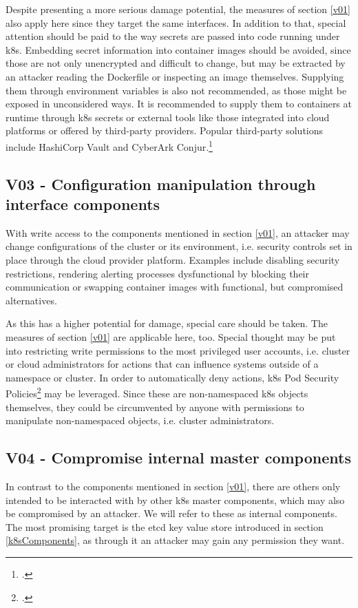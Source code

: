 Despite presenting a more serious damage potential, the measures of section \ref{v01} also apply here since they target the same interfaces.
In addition to that, special attention should be paid to the way secrets are passed into code running under \gls{k8s}. Embedding secret information into container images should be avoided, since those are not only unencrypted and difficult to change, but may be extracted by an attacker reading the Dockerfile or inspecting an image themselves. Supplying them through environment variables is also not recommended, as those might be exposed in unconsidered ways. It is recommended to supply them to containers at runtime through \gls{k8s} secrets or external tools like those integrated into cloud platforms or offered by third-party providers. Popular third-party solutions include HashiCorp Vault and CyberArk Conjur.\footcite[][, chapter 7]{k8sBook}

\subsection{V03 - Configuration manipulation through interface components}
With write access to the components mentioned in section \ref{v01}, an attacker may change configurations of the cluster or its environment, i.e. security controls set in place through the cloud provider platform. Examples include disabling security restrictions, rendering alerting processes dysfunctional by blocking their communication or swapping container images with functional, but compromised alternatives.

As this has a higher potential for damage, special care should be taken. The measures of section \ref{v01} are applicable here, too. Special thought may be put into restricting write permissions to the most privileged user accounts, i.e. cluster or cloud administrators for actions that can influence systems outside of a namespace or cluster.
In order to automatically deny actions, \gls{k8s} Pod Security Policies\footcite[][, section 'What is a Pod Security Policy?']{securityPolicy} may be leveraged. Since these are non-namespaced \gls{k8s} objects themselves, they could be circumvented by anyone with permissions to manipulate non-namespaced objects, i.e. cluster administrators.

\subsection{V04 - Compromise internal master components}
In contrast to the components mentioned in section \ref{v01}, there are others only intended to be interacted with by other \gls{k8s} master components, which may also be compromised by an attacker. We will refer to these as internal components.
The most promising target is the etcd key value store introduced in section \ref{k8sComponents}, as through it an attacker may gain any permission they want.

